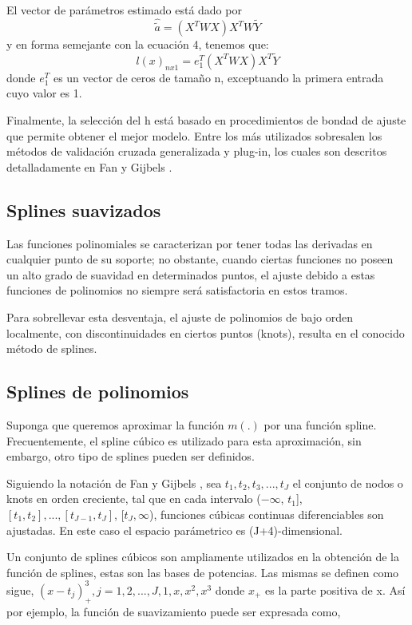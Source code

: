 \documentclass[
  12pt,
]{krantz}
\begin{document}
El vector de parámetros estimado está dado por \[\hat{\tilde{a}} = (X^{T}WX)X^{T}W \tilde{Y} \]
y en forma semejante con la ecuación 4, tenemos que: \[l(x)_{nx1} = e_{1}^{T} (X^{T}WX)X^{T} \tilde{Y}\] donde \(e_{1}^{T}\)
es un vector de ceros de tamaño n, exceptuando la primera entrada cuyo valor es 1.

Finalmente, la selección del h está basado en procedimientos de bondad de ajuste que permite obtener el mejor modelo. Entre los más utilizados sobresalen los métodos de validación cruzada generalizada y plug-in, los cuales son descritos detalladamente en Fan y Gijbels \cite{FG}.

\hypertarget{splines-suavizados}{%
\subsection{Splines suavizados}\label{splines-suavizados}}

Las funciones polinomiales se caracterizan por tener todas las derivadas en cualquier punto de su soporte; no obstante, cuando ciertas funciones no poseen un alto grado de suavidad en determinados puntos, el ajuste debido a estas funciones de polinomios no siempre será satisfactoria en estos tramos.

Para sobrellevar esta desventaja, el ajuste de polinomios de bajo orden localmente, con discontinuidades en ciertos puntos (knots), resulta en el conocido método de splines.

\hypertarget{splines-de-polinomios}{%
\subsection{Splines de polinomios}\label{splines-de-polinomios}}

Suponga que queremos aproximar la función \(m(.)\) por una función spline. Frecuentemente, el spline cúbico es utilizado para esta aproximación, sin embargo, otro tipo de splines pueden ser definidos.

Siguiendo la notación de Fan y Gijbels \cite{FG}, sea \(t_{1}, t_{2}, t_{3},...,t_{J}\) el conjunto de nodos o knots en orden creciente, tal que en cada intervalo (\(-\infty\), \(t_{1}\){]}, \([t_{1}, t_{2}],..., [t_{J-1}, t_{J}]\), {[}\(t_{J}, \infty\)), funciones cúbicas continuas diferenciables son ajustadas. En este caso el espacio parámetrico es (J+4)-dimensional.

Un conjunto de splines cúbicos son ampliamente utilizados en la obtención de la función de splines, estas son las bases de potencias. Las mismas se definen como sigue, \((x- t_{j})_{+}^{3}, j= 1,2,...,J,1,x,x^2,x^3\) donde \(x_{+}\) es la parte positiva de x. Así por ejemplo, la función de suavizamiento puede ser expresada como,
\end{document}
